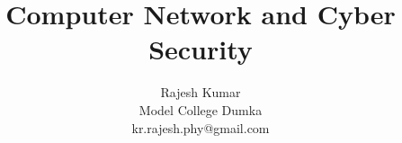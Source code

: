 \documentclass{beamer}
\begin{document}
\title{Computer Network and Cyber Security}
\author{Rajesh Kumar \\Model College Dumka\\kr.rajesh.phy@gmail.com}
\date{}

\begin{frame}
  \titlepage
\end{frame}





\end{document}
